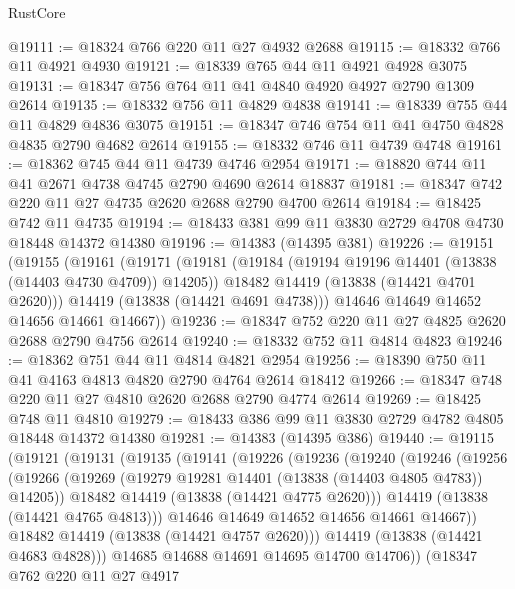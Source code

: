 \begin{lexlean}{RustCore}
\begin{coremodule}
@19111 := @18324 @766 @220 @11 @27 @4932 @2688
@19115 := @18332 @766 @11 @4921 @4930
@19121 := @18339 @765 @44 @11 @4921 @4928 @3075
@19131 := @18347 @756 @764 @11 @41 @4840 @4920 @4927 @2790 @1309 @2614
@19135 := @18332 @756 @11 @4829 @4838
@19141 := @18339 @755 @44 @11 @4829 @4836 @3075
@19151 := @18347 @746 @754 @11 @41 @4750 @4828 @4835 @2790 @4682 @2614
@19155 := @18332 @746 @11 @4739 @4748
@19161 := @18362 @745 @44 @11 @4739 @4746 @2954
@19171 := @18820 @744 @11 @41 @2671 @4738 @4745 @2790 @4690 @2614 @18837
@19181 := @18347 @742 @220 @11 @27 @4735 @2620 @2688 @2790 @4700 @2614
@19184 := @18425 @742 @11 @4735
@19194 := @18433 @381 @99 @11 @3830 @2729 @4708 @4730 @18448 @14372 @14380
@19196 := @14383 (@14395 @381)
@19226 := @19151
    (@19155
      (@19161
        (@19171
          (@19181
            (@19184 (@19194 @19196 @14401 (@13838 (@14403 @4730 @4709)) @14205))
            @18482
            @14419
            (@13838 (@14421 @4701 @2620)))
          @14419
          (@13838 (@14421 @4691 @4738)))
        @14646
        @14649
        @14652
        @14656
        @14661
        @14667))
@19236 := @18347 @752 @220 @11 @27 @4825 @2620 @2688 @2790 @4756 @2614
@19240 := @18332 @752 @11 @4814 @4823
@19246 := @18362 @751 @44 @11 @4814 @4821 @2954
@19256 := @18390 @750 @11 @41 @4163 @4813 @4820 @2790 @4764 @2614 @18412
@19266 := @18347 @748 @220 @11 @27 @4810 @2620 @2688 @2790 @4774 @2614
@19269 := @18425 @748 @11 @4810
@19279 := @18433 @386 @99 @11 @3830 @2729 @4782 @4805 @18448 @14372 @14380
@19281 := @14383 (@14395 @386)
@19440 := @19115
    (@19121
      (@19131
        (@19135
          (@19141
            (@19226
              (@19236
                (@19240
                  (@19246
                    (@19256
                      (@19266
                        (@19269 (@19279 @19281 @14401 (@13838 (@14403 @4805 @4783)) @14205))
                        @18482
                        @14419
                        (@13838 (@14421 @4775 @2620)))
                      @14419
                      (@13838 (@14421 @4765 @4813)))
                    @14646
                    @14649
                    @14652
                    @14656
                    @14661
                    @14667))
                @18482
                @14419
                (@13838 (@14421 @4757 @2620)))
              @14419
              (@13838 (@14421 @4683 @4828)))
            @14685
            @14688
            @14691
            @14695
            @14700
            @14706))
        (@18347
          @762
          @220
          @11
          @27
          @4917

\end{coremodule}
\end{lexlean}
